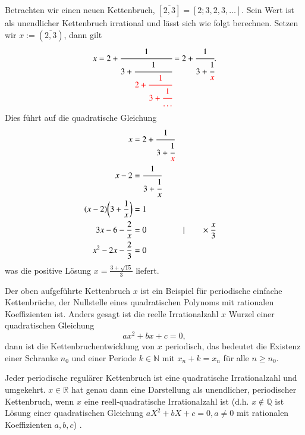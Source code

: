 \begin{beispiel}
Betrachten wir einen neuen Kettenbruch, $[\overline{2,3}] =  [2;3,2,3,\dots]$.
Sein Wert ist als unendlicher Kettenbruch irrational und lässt sich
wie folgt berechnen. Setzen wir $x:=(\overline{2,3})$, dann gilt
\begin{equation}
x
=
2 + \cfrac{1}{3+\cfrac{1}{\color{red}2+\cfrac{1}{3+\cfrac{1}{\dots}}}}
=
2 + \cfrac{1}{3+\cfrac{1}{\color{red}x}}.
\end{equation}
Dies führt auf die quadratische Gleichung 
\begin{align*}
x &= 2 + \cfrac{1}{3+\cfrac{1}{{\color{red}x}}}
\\
x - 2 &= \cfrac{1}{3+\cfrac{1}{x}}
\\
(x - 2)\biggl(3 + \frac{1}{x}\biggr) &= 1
\\
3x - 6 - \frac{2}{x} &= 0 &&\vert \qquad\times\frac{x}{3}
\\
x^2 - 2x - \frac{2}{3} &= 0
\end{align*}
was die positive Lösung $x = \displaystyle \frac{3+\sqrt{15}}{3}$ liefert.
\end{beispiel}
Der oben aufgeführte Kettenbruch $x$ ist ein Beispiel für periodische
einfache Kettenbrüche, der Nullstelle eines quadratischen Polynoms
mit rationalen Koeffizienten ist. Anders gesagt ist die reelle
Irrationalzahl $x$ Wurzel einer quadratischen Gleichung
\begin{equation}
ax^2 + bx + c = 0,
\end{equation}
dann ist die Kettenbruchentwicklung von $x$ periodisch, das bedeutet
die Existenz einer Schranke $n_0$ und einer Periode $k \in \mathbb{N}$
mit $x_n+k = x_n$ für alle $n\ge n_0$.

\begin{satz}
Jeder periodische regulärer Kettenbruch ist eine quadratische
Irrationalzahl und umgekehrt. $x \in \mathbb{R}$ hat genau dann eine 
Darstellung als unendlicher, periodischer Kettenbruch, wenn $x$ eine
reell-quadratische Irrationalzahl ist (d.h. $x \notin \mathbb{Q}$ ist Lösung
einer quadratischen Gleichung $aX^2 + bX + c = 0, a \neq 0$ mit rationalen 
Koeffizienten $a,b,c$) \cite{kettenbruch:perron}.
\end{satz}

